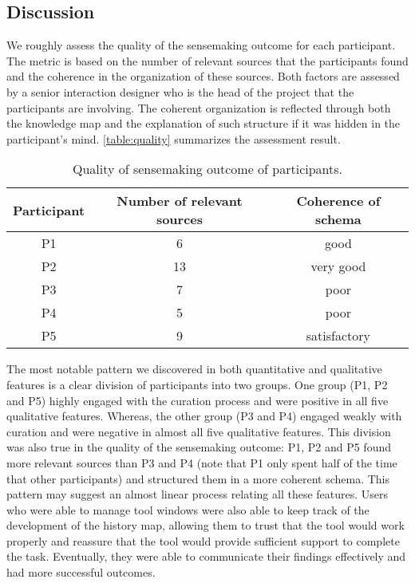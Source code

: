 \subsection{Discussion}
We roughly assess the quality of the sensemaking outcome for each participant. The metric is based on the number of relevant sources that the participants found and the coherence in the organization of these sources. Both factors are assessed by a senior interaction designer who is the head of the project that the participants are involving. The coherent organization is reflected through both the knowledge map and the explanation of such structure if it was hidden in the participant's mind. \autoref{table:quality} summarizes the assessment result.

\begin{table}[!htb]
\centering
\sffamily\small
\caption{Quality of sensemaking outcome of participants.}
\label{table:quality}
\begin{tabular}{ccc}
	\toprule
	\textbf{Participant} & \textbf{Number of relevant sources} & \textbf{Coherence of schema} \\
	\midrule
 		P1 & 6 & good \\
 		P2 & 13 & very good \\
 		P3 & 7 & poor \\
 		P4 & 5 & poor \\
 		P5 & 9 & satisfactory \\
	\bottomrule
\end{tabular}
\end{table}

The most notable pattern we discovered in both quantitative and qualitative features is a clear division of participants into two groups. One group (P1, P2 and P5) highly engaged with the  curation process and were positive in all five qualitative features. Whereas, the other group (P3 and P4) engaged weakly with curation and were negative in almost all five qualitative features. This division was also true in the quality of the sensemaking outcome: P1, P2 and P5 found more relevant sources than P3 and P4 (note that P1 only spent half of the time that other participants) and structured them in a more coherent schema. This pattern may suggest an almost linear process relating all these features. Users who were able to manage tool windows were also able to keep track of the development of the history map, allowing them to trust that the tool would work properly and reassure that the tool would provide sufficient support to complete the task. Eventually, they were able to communicate their findings effectively and had more successful outcomes.

